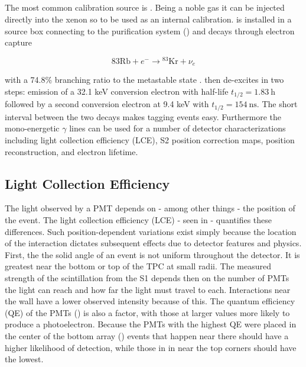 \subsection{}
\label{subsec:calibrations_kr}
The most common calibration source is .  Being a noble gas it can be injected directly into the xenon so to be used as an
internal calibration.   is installed in a source box connecting to the purification system
() and decays through electron capture

\begin{equation}
\mathrm{{83}Rb} + e^- \rightarrow \mathrm{^{83}Kr} + \nu_e
\end{equation}

with a 74.8\% branching ratio to the metastable state .   then de-excites in two steps: emission of a 32.1 keV
conversion electron with half-life $t_{1/2} = 1.83\ \mathrm{h}$ followed by a second conversion electron at 9.4 keV with
$t_{1/2} = 154\ \mathrm{ns}$.  The short
interval between the two decays makes tagging events easy.  Furthermore the mono-energetic $\gamma$ lines can be used for a number of
detector characterizations including light collection efficiency (LCE), S2 position correction maps, position reconstruction, and electron
lifetime.

\subsection{Light Collection Efficiency}
\label{subsec:calibrations_lce}
The light observed by a PMT depends on - among other things - the position of the event.  The light collection efficiency (LCE) - seen
in  - quantifies these differences.  Such position-dependent variations exist simply because the location of
the interaction dictates subsequent effects due to detector features and physics.  First, the the solid angle of an event is not uniform
throughout the detector.  It is greatest near the bottom or top of the TPC at small radii.  The measured strength of the scintillation
from the S1 depends then on the number of PMTs the light can reach and how far the light must travel to each.  Interactions near the
wall have a lower observed intensity because of this.  The quantum efficiency (QE) of the PMTs () is also a
factor, with those at larger values more likely to produce a photoelectron.  Because the PMTs with the highest QE were placed in the
center of the bottom array () events that happen near there should have a higher likelihood of detection,
while those in in near the top corners should have the lowest.

